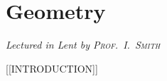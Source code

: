 \chapter[Geometry \\ \textnormal{\emph{Lectured in Lent \oldstylenums{2022} by \textsc{Prof.\ I.\ Smith}}}]{Geometry}
\emph{\Large Lectured in Lent  by \textsc{Prof.\ I.\ Smith}}

[[INTRODUCTION]]


